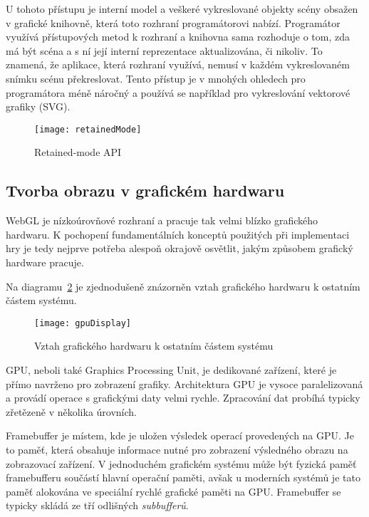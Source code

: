 U tohoto přístupu je interní model a veškeré vykreslované objekty scény obsažen v grafické knihovně, která toto rozhraní programátorovi nabízí. Programátor využívá přístupových metod k rozhraní a knihovna sama rozhoduje o tom, zda má být scéna a s ní její interní reprezentace aktualizována, či nikoliv. To znamená, že aplikace, která rozhraní využívá, nemusí v každém vykreslovaném snímku scénu překreslovat. Tento přístup je v mnohých ohledech pro programátora méně náročný a používá se například pro vykreslování vektorové grafiky (SVG). 

\begin{figure}[htb]
\centering
\texttt{[image: retainedMode]}
\caption{Retained-mode API}
\label{fig:retainedMode}
\end{figure}
 
\subsection*{Tvorba obrazu v grafickém hardwaru}
\label{subsection:tvorbaObrazu}
WebGL je nízkoúrovňové rozhraní a pracuje tak velmi blízko grafického hardwaru. K pochopení fundamentálních konceptů použitých při implementaci hry je tedy nejprve potřeba alespoň okrajově osvětlit, jakým způsobem grafický hardware pracuje. 

Na diagramu~\ref{fig:gpuDisplay} je zjednodušeně znázorněn vztah grafického hardwaru k ostatním částem systému.

\begin{figure}[htb]
\centering
\texttt{[image: gpuDisplay]}
\caption{Vztah grafického hardwaru k ostatním částem systému}
\label{fig:gpuDisplay}
\end{figure}

GPU, neboli také Graphics Processing Unit, je dedikované zařízení, které je přímo navrženo pro zobrazení grafiky. Architektura GPU je vysoce paralelizovaná a provádí operace s grafickými daty velmi rychle. Zpracování dat probíhá typicky zřetězeně v několika úrovních.

Framebuffer je místem, kde je uložen výsledek operací provedených na GPU. Je to paměť, která obsahuje informace nutné pro zobrazení výsledného obrazu na zobrazovací zařízení. V jednoduchém grafickém systému může být fyzická paměť framebufferu součástí hlavní operační paměti, avšak u moderních systémů je tato paměť alokována ve speciální rychlé grafické paměti na GPU. Framebuffer se typicky skládá ze tří odlišných \textit{subbufferů}.

